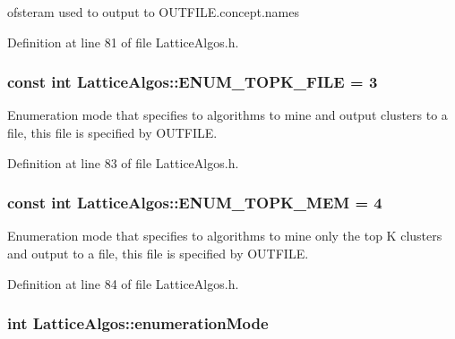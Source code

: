 ofsteram used to output to OUTFILE.concept.names 



Definition at line 81 of file LatticeAlgos.h.

\hypertarget{class_lattice_algos_a04a0ea3a71c5b598242fa4ec3d4fce79}{
\subsubsection[{ENUM\_\-TOPK\_\-FILE}]{\setlength{\rightskip}{0pt plus 5cm}const int {\bf LatticeAlgos::ENUM\_\-TOPK\_\-FILE} = 3}}
\label{class_lattice_algos_a04a0ea3a71c5b598242fa4ec3d4fce79}


Enumeration mode that specifies to algorithms to mine and output clusters to a file, this file is specified by OUTFILE. 



Definition at line 83 of file LatticeAlgos.h.

\hypertarget{class_lattice_algos_a1c6a4b5dce3ccade9e17ce4b2a6afbe7}{
\subsubsection[{ENUM\_\-TOPK\_\-MEM}]{\setlength{\rightskip}{0pt plus 5cm}const int {\bf LatticeAlgos::ENUM\_\-TOPK\_\-MEM} = 4}}
\label{class_lattice_algos_a1c6a4b5dce3ccade9e17ce4b2a6afbe7}


Enumeration mode that specifies to algorithms to mine only the top K clusters and output to a file, this file is specified by OUTFILE. 



Definition at line 84 of file LatticeAlgos.h.

\hypertarget{class_lattice_algos_a03adc61166377c993b4d1ef8f8ee12ee}{
\subsubsection[{enumerationMode}]{\setlength{\rightskip}{0pt plus 5cm}int {\bf LatticeAlgos::enumerationMode}}}
\label{class_lattice_algos_a03adc61166377c993b4d1ef8f8ee12ee}


